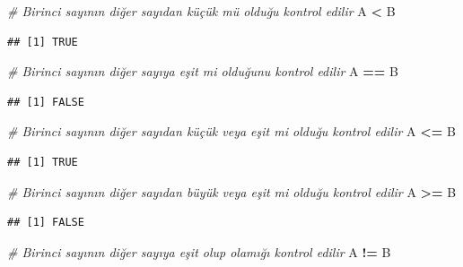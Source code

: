 \documentclass[
]{book}
\newenvironment{Shaded}{\begin{snugshade}}{\end{snugshade}}
\newcommand{\CommentTok}[1]{\textcolor[rgb]{0.56,0.35,0.01}{\textit{#1}}}
\newcommand{\NormalTok}[1]{#1}
\newcommand{\SpecialCharTok}[1]{\textcolor[rgb]{0.81,0.36,0.00}{\textbf{#1}}}
\begin{document}
\begin{Shaded}
\begin{Highlighting}[]
\CommentTok{\# Birinci sayının diğer sayıdan küçük mü olduğu kontrol edilir}
\NormalTok{A }\SpecialCharTok{\textless{}}\NormalTok{ B}
\end{Highlighting}
\end{Shaded}

\begin{verbatim}
## [1] TRUE
\end{verbatim}

\begin{Shaded}
\begin{Highlighting}[]
\CommentTok{\# Birinci sayının diğer sayıya eşit mi olduğunu kontrol edilir}
\NormalTok{A }\SpecialCharTok{==}\NormalTok{ B}
\end{Highlighting}
\end{Shaded}

\begin{verbatim}
## [1] FALSE
\end{verbatim}

\begin{Shaded}
\begin{Highlighting}[]
\CommentTok{\# Birinci sayının diğer sayıdan küçük veya eşit mi olduğu kontrol edilir}
\NormalTok{A }\SpecialCharTok{\textless{}=}\NormalTok{ B}
\end{Highlighting}
\end{Shaded}

\begin{verbatim}
## [1] TRUE
\end{verbatim}

\begin{Shaded}
\begin{Highlighting}[]
\CommentTok{\# Birinci sayının diğer sayıdan büyük veya eşit mi olduğu kontrol edilir}
\NormalTok{A }\SpecialCharTok{\textgreater{}=}\NormalTok{ B}
\end{Highlighting}
\end{Shaded}

\begin{verbatim}
## [1] FALSE
\end{verbatim}

\begin{Shaded}
\begin{Highlighting}[]
\CommentTok{\# Birinci sayının diğer sayıya eşit olup olamığı kontrol edilir}
\NormalTok{A }\SpecialCharTok{!=}\NormalTok{ B}
\end{Highlighting}
\end{Shaded}
\end{document}
